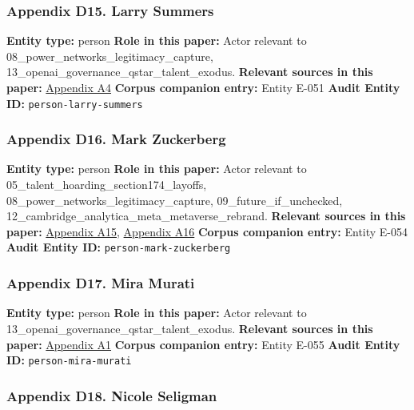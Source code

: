 \documentclass[
  american,
  11pt,
  letterpaper,
]{article}
\begin{document}
\subsubsection{Appendix D15. Larry
Summers}\label{ch-08-appendix-d15-larry-summers}

\textbf{Entity type:} person \textbf{Role in this paper:} Actor relevant
to 08\_power\_networks\_legitimacy\_capture,
13\_openai\_governance\_qstar\_talent\_exodus. \textbf{Relevant sources
in this paper:}
\hyperref[ch-08-appendix-a4-openai-announces-new-members-to-board-of-directors]{Appendix
A4} \textbf{Corpus companion entry:} Entity E-051 \textbf{Audit Entity
ID:} \texttt{person-larry-summers}

\subsubsection{Appendix D16. Mark
Zuckerberg}\label{ch-08-appendix-d16-mark-zuckerberg}

\textbf{Entity type:} person \textbf{Role in this paper:} Actor relevant
to 05\_talent\_hoarding\_section174\_layoffs,
08\_power\_networks\_legitimacy\_capture, 09\_future\_if\_unchecked,
12\_cambridge\_analytica\_meta\_metaverse\_rebrand. \textbf{Relevant
sources in this paper:}
\hyperref[ch-08-appendix-a15-inside-mark-zuckerbergs-top-secret-hawaii-compound]{Appendix
A15},
\hyperref[ch-08-appendix-a16-mark-zuckerberg-downplays-his-5-000-square-foot-underground-bunker-in-hawaii-just-a-little-shelter]{Appendix
A16} \textbf{Corpus companion entry:} Entity E-054 \textbf{Audit Entity
ID:} \texttt{person-mark-zuckerberg}

\subsubsection{Appendix D17. Mira
Murati}\label{ch-08-appendix-d17-mira-murati}

\textbf{Entity type:} person \textbf{Role in this paper:} Actor relevant
to 13\_openai\_governance\_qstar\_talent\_exodus. \textbf{Relevant
sources in this paper:}
\hyperref[ch-08-appendix-a1-openai-announces-leadership-transition]{Appendix
A1} \textbf{Corpus companion entry:} Entity E-055 \textbf{Audit Entity
ID:} \texttt{person-mira-murati}

\subsubsection{Appendix D18. Nicole
Seligman}\label{ch-08-appendix-d18-nicole-seligman}
\end{document}
